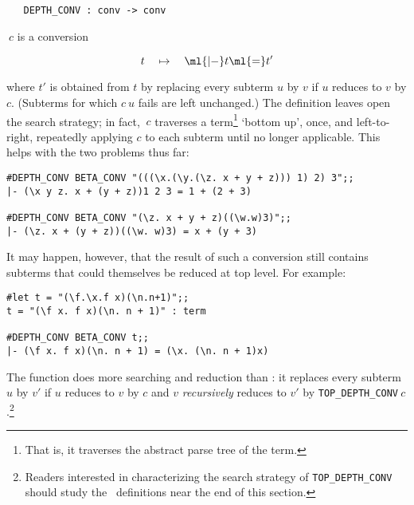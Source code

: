 \begin{holboxed}
\begin{verbatim}
   DEPTH_CONV : conv -> conv
\end{verbatim}\end{holboxed}

\noindent {}$\ c$ is a conversion

\[t\quad\mapsto\quad \ml{|- }t\ml{ = }t'\]

\noindent where $t'$ is obtained from $t$ by replacing every subterm
$u$ by $v$ if $u$ reduces to $v$ by $c$. (Subterms for which
$c\ u$ fails are left unchanged.) The definition leaves open the search strategy;
in fact,
$\ c$
 traverses a term\footnote{That is, it traverses
the abstract parse tree of the term.} `bottom up', once, and left-to-right,
repeatedly applying $c$ to each subterm until no longer applicable.
This helps with the two problems thus far:

\setcounter{sessioncount}{1}
\begin{session}\begin{verbatim}
#DEPTH_CONV BETA_CONV "(((\x.(\y.(\z. x + y + z))) 1) 2) 3";;
|- (\x y z. x + (y + z))1 2 3 = 1 + (2 + 3)

#DEPTH_CONV BETA_CONV "(\z. x + y + z)((\w.w)3)";;
|- (\z. x + (y + z))((\w. w)3) = x + (y + 3)
\end{verbatim}\end{session}

It may happen, however,
that the result of such a conversion still contains subterms
that could themselves be reduced at top level. For example:

\setcounter{sessioncount}{1}
\begin{session}\begin{verbatim}
#let t = "(\f.\x.f x)(\n.n+1)";;
t = "(\f x. f x)(\n. n + 1)" : term

#DEPTH_CONV BETA_CONV t;;
|- (\f x. f x)(\n. n + 1) = (\x. (\n. n + 1)x)
\end{verbatim}\end{session}

\noindent The function 
 does more
searching and reduction than
: it replaces
every subterm
$u$ by $v'$ if $u$ reduces to $v$ by $c$ and $v$ {\it recursively\/} reduces
to $v'$ by {\tt TOP\_DEPTH\_CONV}$\ c$.\footnote{Readers interested
in characterizing the search strategy of {\tt TOP\_DEPTH\_CONV} should
study the \ML\ definitions near the end of this section.}


